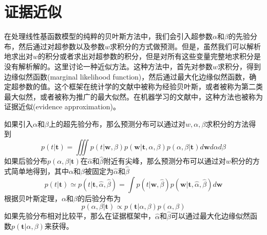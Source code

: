 \section{证据近似}
在处理线性基函数模型的纯粹的贝叶斯方法中，我们会引入超参数$\alpha$和$\beta$的先验分布，然后通过对超参数以及参数$w$求积分的方式做预测。但是，虽然我们可以解析地求出对$w$的积分或者求出对超参数的积分，但是对所有这些变量完整地求积分是没有解析解的。这里讨论一种近似方法。这种方法中，首先对参数$w$求积分，得到边缘似然函数(marginal likelihood function)，然后通过最大化边缘似然函数，确定超参数的值。这个框架在统计学的文献中被称为经验贝叶斯，或者被称为第二类最大似然，或者被称为推广的最大似然。在机器学习的文献中，这种方法也被称为证据近似(evidence approximation)。

如果引入$\alpha$和$\beta$上的超先验分布，那么预测分布可以通过对$w,\alpha,\beta$求积分的方法得到 
\begin{equation}
	p(t|\boldsymbol{t})=\iiint p(t|\boldsymbol{w},\beta)p(\boldsymbol{w}|\boldsymbol{t},\alpha,\beta)p(\alpha,\beta|\boldsymbol{t})d\boldsymbol{w}d\alpha d\beta
\end{equation}
如果后验分布$p(\alpha,\beta|\boldsymbol{t})$在$\hat{\alpha}$和$\hat{\beta}$附近有尖峰，那么预测分布可以通过对$w$积分的方式简单地得到，其中$\alpha$和$\beta$被固定为$\hat{\alpha}$和$\hat{\beta}$
\begin{equation}
	p(t|\boldsymbol{t})\simeq p(t|\boldsymbol{t},\hat{\alpha},\hat{\beta})=\int p(t|\boldsymbol{w},\hat{\beta})p(\boldsymbol{w}|\boldsymbol{t},\hat{\alpha},\hat{\beta})d\boldsymbol{w}
\end{equation}
根据贝叶斯定理，$\alpha$和$\beta$的后验分布为
\begin{equation}
	p(\alpha,\beta|\boldsymbol{t})\propto p(\boldsymbol{t}|\alpha,\beta)p(\alpha,\beta)
\end{equation}
如果先验分布相对比较平，那么在证据框架中，$\hat{\alpha}$和$\hat{\beta}$可以通过最大化边缘似然函数$p(\boldsymbol{t}|\alpha,\beta)$来获得。